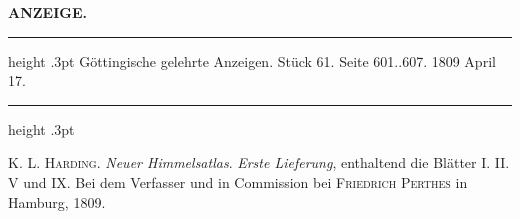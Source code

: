 \clearpage
\thispagestyle{empty}
\noindent{}%
%
\parbox[t]{\dimexpr\linewidth-24mm\relax}{\centering\footnotesize\bfseries ANZEIGE.\par}%
\makebox[12mm][r]{{}}\par\medskip
{}
\begin{center}\parbox{.85\linewidth}{\centering\small
\hrule height .3pt\relax\vspace{2.5pt}
Göttingische gelehrte Anzeigen. Stück 61. Seite 601..607. 1809 April 17.\par
\vspace{2.5pt}\hrule height .3pt\relax
}\end{center}

\textsc{K. L. Harding}. \emph{Neuer Himmelsatlas}. \emph{Erste Lieferung}, enthaltend die Blätter I. II. V und IX. Bei dem Verfasser und in Commission bei \textsc{Friedrich Perthes} in Hamburg, 1809.


